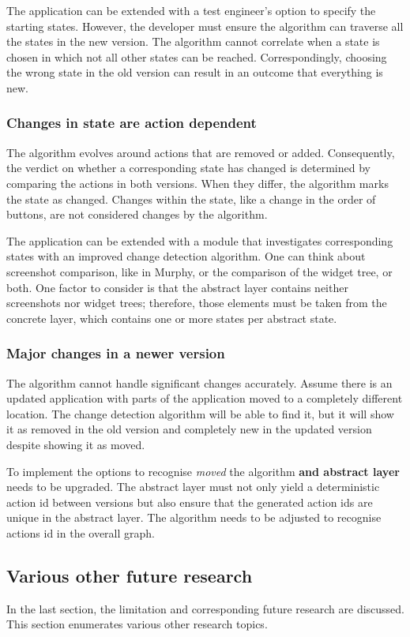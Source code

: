 The application can be extended with a test engineer's option to specify the starting states. However, the developer must ensure the algorithm can traverse all the states in the new version. The algorithm cannot correlate when a state is chosen in which not all other states can be reached. Correspondingly, choosing the wrong state in the old version can result in an outcome that everything is new. 

\subsubsection{Changes in state are action dependent}
The algorithm evolves around actions that are removed or added. Consequently, the verdict on whether a corresponding state has changed is determined by comparing the actions in both versions. When they differ, the algorithm marks the state as changed. Changes within the state, like a change in the order of buttons, are not considered changes by the algorithm. 

The application can be extended with a module that investigates corresponding states with an improved change detection algorithm. One can think about screenshot comparison, like in Murphy, or the comparison of the widget tree, or both. One factor to consider is that the abstract layer contains neither screenshots nor widget trees; therefore, those elements must be taken from the concrete layer, which contains one or more states per abstract state. 

\subsubsection{Major changes in a newer version}
The algorithm cannot handle significant changes accurately. Assume there is an updated application with parts of the application moved to a completely different location. The change detection algorithm will be able to find it, but it will show it as removed in the old version and completely new in the updated version despite showing it as moved. 

To implement the options to recognise \textit{moved} the algorithm \textbf{and abstract layer} needs to be upgraded. The abstract layer must not only yield a deterministic action id between versions but also ensure that the generated action ids are unique in the abstract layer. The algorithm needs to be adjusted to recognise actions id in the overall graph. 
 
\subsection{Various other future research}
In the last section, the limitation and corresponding future research are discussed. This section enumerates various other research topics.

